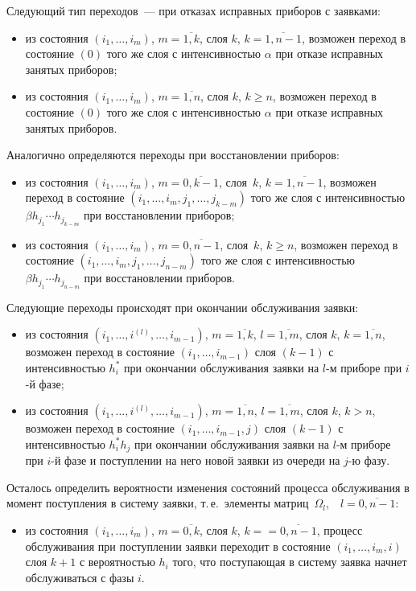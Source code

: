 \begin{multicols}{2}
Следующий тип переходов~--- при отказах исправных приборов с
заявками:
\begin{itemize}
\item
из состояния
$(i_1,\ldots,i_{m})$,
$m=\overline{1,k}$,
слоя $k$, $k=\overline{1,n-1}$, возможен переход в состояние
$(0)$ того же слоя с интенсивностью $\alpha$ при отказе
исправных занятых приборов;
\item
из состояния
$(i_1,\ldots,i_{m})$,
$m=\overline{1,n}$,
слоя $k$, $k\ge n$, возможен переход в состояние $(0)$
того же слоя с интенсивностью $\alpha$ при отказе исправных
занятых приборов.
\end{itemize}

Аналогично определяются переходы при восстановлении приборов:
\begin{itemize}
\item
из состояния
$(i_1,\ldots,i_{m})$,
$m=\overline{0,k-1}$,
слоя~$k$, $k=\overline{1,n-1}$, возможен переход в состояние
$(i_1,\ldots,i_{m},j_{1},\ldots,j_{k-m})$
того же слоя с интенсивностью $\beta h_{j_1}\cdots h_{j_{k-m}}$
при восстановлении приборов;
\item
 из состояния
$(i_1,\ldots,i_{m})$,
$m=\overline{0,n-1}$,
слоя~$k$, $k\ge n$, возможен переход в состояние
$(i_1,\ldots,i_{m},j_{1},\ldots,j_{n-m})$
того же слоя с интенсивностью $\beta h_{j_1}\cdots h_{j_{n-m}}$
при восстановлении приборов.
\end{itemize}

Следующие переходы происходят при окончании обслуживания заявки:
\begin{itemize}
\item из состояния
$(i_1,\ldots,i^{(l)},\ldots,i_{m-1})$,
$m=\overline{1,k}$,
$l=\overline{1,m}$,
слоя $k$, $k=\overline{1,n}$, возможен переход в состояние
$(i_1,\ldots,i_{m-1})$ слоя $(k-1)$ с интенсивностью $h^*_i$
при окончании обслуживания заявки на $l$-м приборе при
$i$-й фазе;
\item
из состояния
$(i_1,\ldots,i^{(l)},\ldots,i_{m-1})$,
$m=\overline{1,n}$,
$l=\overline{1,m}$,
слоя $k$, $k>n$, возможен переход в состояние
$(i_1,\ldots,i_{m-1},j)$ слоя $(k-1)$ с
интенсивностью $h^*_i h_j$ при окончании обслуживания заявки
на $l$-м приборе при $i$-й фазе и поступлении на него новой
заявки из очереди на $j$-ю фазу.
\end{itemize}

Осталось определить вероятности изменения состояний процесса
обслуживания в момент поступления в систему заявки, т.\,е.\
элементы мат\-риц~$\Omega_l$,\ \ $l=\overline{0,n-1}$:
\begin{itemize}
\item из состояния
$(i_1,\ldots,i_{m})$, $m=\overline{0,k}$,
слоя $k$, $k=$\linebreak $=\overline{0,n-1}$,
 процесс обслуживания при поступлении заявки переходит в состояние
$(i_1,\ldots,i_{m},i)$ слоя $k+1$
с вероятностью $h_i$ того, что поступающая в систему заявка начнет
обслуживаться с фазы $i$.
\end{itemize}


\end{multicols}
